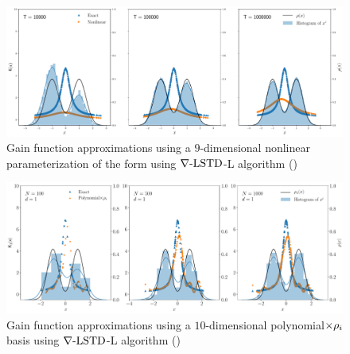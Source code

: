 \begin{figure}
	\includegraphics[width=6in]{images/Chap4_diff_td_nl}
	\caption[$\gradTD$ performance with nonlinear parameterization]{Gain function approximations using a $9$-dimensional nonlinear parameterization of the form using $\gradTD$-L algorithm ()}
	\label{fig:diff_td_nl}
\end{figure}

\begin{figure}
	\includegraphics[width=6in]{images/Chap4_lang_td_wt_polynomials}
	\caption[$\gradTD$-L performance with polynomial basis]{Gain function approximations using a $10$-dimensional polynomial$\times \rho_i$ basis using $\gradTD$-L algorithm ()}
	\label{fig:diff_td_lang_linear}
\end{figure}

